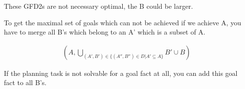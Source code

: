These GFD2s are not necessary optimal, the B could be larger.


\noindent
To get the maximal set of goals which can not be achieved if we achieve A, 
you have to merge all B's which belong to an A' which is a subset of A. 

\begin{align*}
	(A, \bigcup_{(A', B') \in \{(A'', B'') \in D | A' \subseteq A\}} B' \cup B)
\end{align*}



\noindent
If the planning task is not solvable for a goal fact at all, you can add 
this goal fact to all B's.\\
